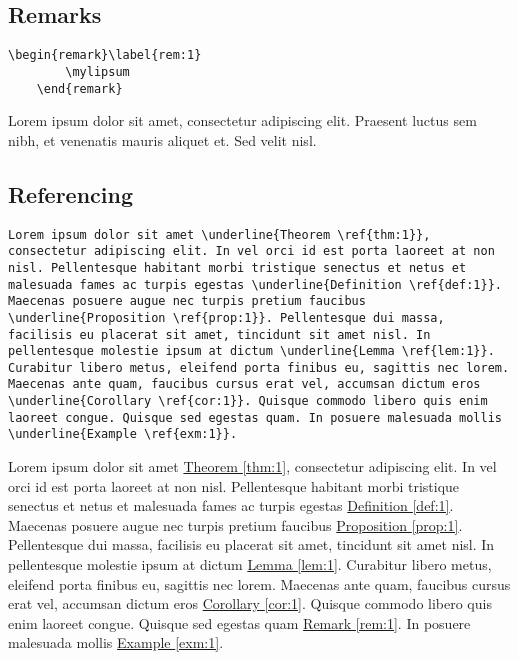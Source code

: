 \documentclass{article}
\newcommand{\mylipsum}{Lorem ipsum dolor sit amet, consectetur adipiscing elit. Praesent luctus sem nibh, et venenatis mauris aliquet et. Sed velit nisl.}
\begin{document}
	\subsection{Remarks}
	\begin{Verbatim}[tabsize=4]
	\begin{remark}\label{rem:1}
		\mylipsum
	\end{remark}
	\end{Verbatim}
	\begin{remark}\label{rem:1}
		\mylipsum
	\end{remark}
	
	\subsection{Referencing}
	\begin{Verbatim}[breaklines=true]
	Lorem ipsum dolor sit amet \underline{Theorem \ref{thm:1}}, consectetur adipiscing elit. In vel orci id est porta laoreet at non nisl. Pellentesque habitant morbi tristique senectus et netus et malesuada fames ac turpis egestas \underline{Definition \ref{def:1}}. Maecenas posuere augue nec turpis pretium faucibus \underline{Proposition \ref{prop:1}}. Pellentesque dui massa, facilisis eu placerat sit amet, tincidunt sit amet nisl. In pellentesque molestie ipsum at dictum \underline{Lemma \ref{lem:1}}. Curabitur libero metus, eleifend porta finibus eu, sagittis nec lorem. Maecenas ante quam, faucibus cursus erat vel, accumsan dictum eros \underline{Corollary \ref{cor:1}}. Quisque commodo libero quis enim laoreet congue. Quisque sed egestas quam. In posuere malesuada mollis \underline{Example \ref{exm:1}}.
	\end{Verbatim}

	Lorem ipsum dolor sit amet \underline{Theorem \ref{thm:1}}, consectetur adipiscing elit. In vel orci id est porta laoreet at non nisl. Pellentesque habitant morbi tristique senectus et netus et malesuada fames ac turpis egestas \underline{Definition \ref{def:1}}. Maecenas posuere augue nec turpis pretium faucibus \underline{Proposition \ref{prop:1}}. Pellentesque dui massa, facilisis eu placerat sit amet, tincidunt sit amet nisl. In pellentesque molestie ipsum at dictum \underline{Lemma \ref{lem:1}}. Curabitur libero metus, eleifend porta finibus eu, sagittis nec lorem. Maecenas ante quam, faucibus cursus erat vel, accumsan dictum eros \underline{Corollary \ref{cor:1}}. Quisque commodo libero quis enim laoreet congue. Quisque sed egestas quam \underline{Remark \ref{rem:1}}. In posuere malesuada mollis \underline{Example \ref{exm:1}}.
	\vspace{15pt}
	
\end{document}
